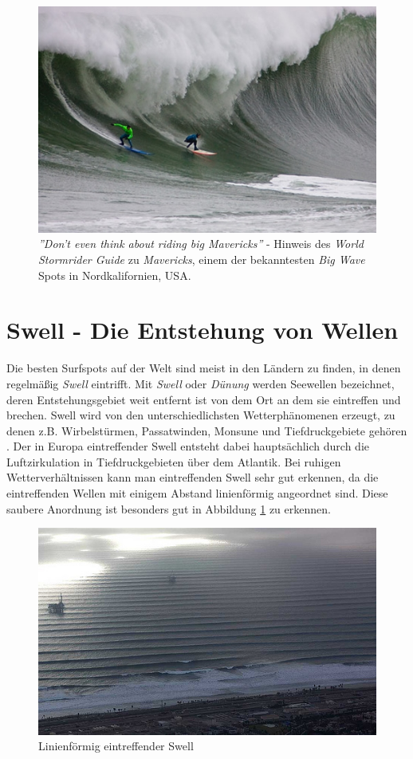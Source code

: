 \begin{figure}[h]
  \includegraphics[width=\textwidth]{bilder/mavericks}
  \caption{\textit{''Don't even think about riding big Mavericks''} -
    Hinweis des \textit{World Stormrider Guide} zu \textit{Mavericks},
    einem der bekanntesten \textit{Big Wave} Spots in Nordkalifornien,
    USA.}
\end{figure}

\section{Swell - Die Entstehung von Wellen}
Die besten Surfspots auf der Welt sind meist in den Ländern zu finden,
in denen regelmäßig \textit{Swell} eintrifft. Mit \textit{Swell} oder
\textit{Dünung} werden Seewellen bezeichnet, deren Entstehungs\-gebiet
weit entfernt ist von dem Ort an dem sie eintreffen und brechen. Swell
wird von den unterschiedlichsten Wetter\-phänomenen erzeugt, zu denen
z.B. Wirbelstürmen, Passatwinden, Monsune und Tiefdruckgebiete gehören
\cite[S.15]{storm_europe_1998}. Der in Europa eintreffender Swell
entsteht dabei hauptsächlich durch die Luftzirkulation in
Tiefdruckgebieten über dem Atlantik. Bei ruhigen Wetterverhältnissen
kann man eintreffenden Swell sehr gut erkennen, da die eintreffenden
Wellen mit einigem Abstand linienförmig angeordnet sind. Diese saubere
Anordnung ist besonders gut in Abbildung \ref{swell-lines} zu
erkennen.

\begin{figure}[h]
 \includegraphics[width=\textwidth]{bilder/swell}
 \caption{Linienförmig eintreffender Swell}
 \label{swell-lines}
\end{figure}

